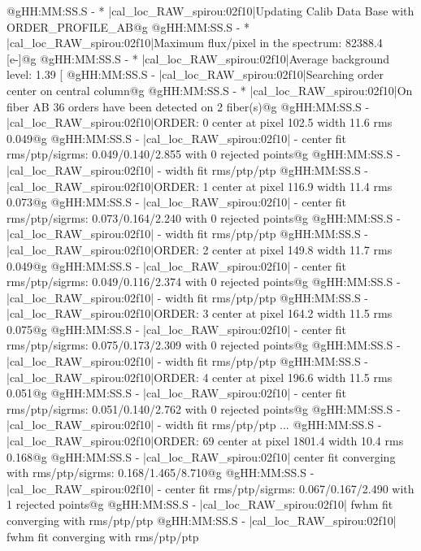 \begin{cmdboxprintspecial}[fontupper=\tiny, fontlower=\tiny]
@gHH:MM:SS.S - * |cal_loc_RAW_spirou:02f10|Updating Calib Data Base with ORDER_PROFILE_AB@g
@gHH:MM:SS.S - * |cal_loc_RAW_spirou:02f10|Maximum flux/pixel in the spectrum: 82388.4 [e-]@g
@gHH:MM:SS.S - * |cal_loc_RAW_spirou:02f10|Average background level: 1.39 [%
@gHH:MM:SS.S -   |cal_loc_RAW_spirou:02f10|Searching order center on central column@g
@gHH:MM:SS.S - * |cal_loc_RAW_spirou:02f10|On fiber AB 36 orders have been detected on 2 fiber(s)@g
@gHH:MM:SS.S -   |cal_loc_RAW_spirou:02f10|ORDER: 0 center at pixel 102.5 width 11.6 rms 0.049@g
@gHH:MM:SS.S -   |cal_loc_RAW_spirou:02f10| - center fit rms/ptp/sigrms: 0.049/0.140/2.855 with 0 rejected points@g
@gHH:MM:SS.S -   |cal_loc_RAW_spirou:02f10| - width  fit rms/ptp/ptp%
@gHH:MM:SS.S -   |cal_loc_RAW_spirou:02f10|ORDER: 1 center at pixel 116.9 width 11.4 rms 0.073@g
@gHH:MM:SS.S -   |cal_loc_RAW_spirou:02f10| - center fit rms/ptp/sigrms: 0.073/0.164/2.240 with 0 rejected points@g
@gHH:MM:SS.S -   |cal_loc_RAW_spirou:02f10| - width  fit rms/ptp/ptp%
@gHH:MM:SS.S -   |cal_loc_RAW_spirou:02f10|ORDER: 2 center at pixel 149.8 width 11.7 rms 0.049@g
@gHH:MM:SS.S -   |cal_loc_RAW_spirou:02f10| - center fit rms/ptp/sigrms: 0.049/0.116/2.374 with 0 rejected points@g
@gHH:MM:SS.S -   |cal_loc_RAW_spirou:02f10| - width  fit rms/ptp/ptp%
@gHH:MM:SS.S -   |cal_loc_RAW_spirou:02f10|ORDER: 3 center at pixel 164.2 width 11.5 rms 0.075@g
@gHH:MM:SS.S -   |cal_loc_RAW_spirou:02f10| - center fit rms/ptp/sigrms: 0.075/0.173/2.309 with 0 rejected points@g
@gHH:MM:SS.S -   |cal_loc_RAW_spirou:02f10| - width  fit rms/ptp/ptp%
@gHH:MM:SS.S -   |cal_loc_RAW_spirou:02f10|ORDER: 4 center at pixel 196.6 width 11.5 rms 0.051@g
@gHH:MM:SS.S -   |cal_loc_RAW_spirou:02f10| - center fit rms/ptp/sigrms: 0.051/0.140/2.762 with 0 rejected points@g
@gHH:MM:SS.S -   |cal_loc_RAW_spirou:02f10| - width  fit rms/ptp/ptp%
...
@gHH:MM:SS.S -   |cal_loc_RAW_spirou:02f10|ORDER: 69 center at pixel 1801.4 width 10.4 rms 0.168@g
@gHH:MM:SS.S -   |cal_loc_RAW_spirou:02f10|      center fit converging with rms/ptp/sigrms: 0.168/1.465/8.710@g
@gHH:MM:SS.S -   |cal_loc_RAW_spirou:02f10| - center fit rms/ptp/sigrms: 0.067/0.167/2.490 with 1 rejected points@g
@gHH:MM:SS.S -   |cal_loc_RAW_spirou:02f10|      fwhm fit converging with rms/ptp/ptp%
@gHH:MM:SS.S -   |cal_loc_RAW_spirou:02f10|      fwhm fit converging with rms/ptp/ptp%

\end{cmdboxprintspecial}
